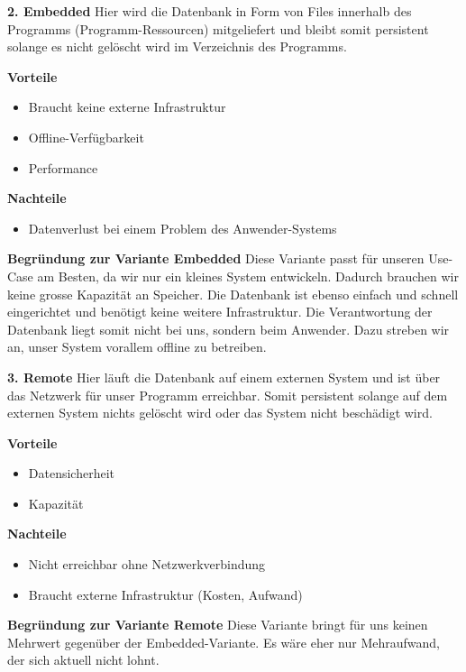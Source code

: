\documentclass[a4paper,12pt]{report}
\begin{document}
    \textbf{2. Embedded}
    Hier wird die Datenbank in Form von Files innerhalb des Programms (Programm-Ressourcen) mitgeliefert und bleibt
    somit persistent solange es nicht gelöscht wird im Verzeichnis des Programms.

    \textbf{Vorteile}
    \begin{itemize}
        \item Braucht keine externe Infrastruktur
        \item Offline-Verfügbarkeit
        \item Performance
    \end{itemize}

    \textbf{Nachteile}
    \begin{itemize}
        \item Datenverlust bei einem Problem des Anwender-Systems
    \end{itemize}

    \textbf{Begründung zur Variante Embedded} Diese Variante passt für unseren Use-Case am Besten, da wir nur ein kleines System entwickeln.
    Dadurch brauchen wir keine grosse Kapazität an Speicher.
    Die Datenbank ist ebenso einfach und schnell eingerichtet und benötigt keine weitere Infrastruktur.
    Die Verantwortung der Datenbank liegt somit nicht bei uns, sondern beim Anwender.
    Dazu streben wir an, unser System vorallem offline zu betreiben.

    \textbf{3. Remote}
    Hier läuft die Datenbank auf einem externen System und ist über das Netzwerk für unser Programm erreichbar.
    Somit persistent solange auf dem externen System nichts gelöscht wird oder das System nicht beschädigt wird.

    \textbf{Vorteile}
    \begin{itemize}
        \item Datensicherheit
        \item Kapazität
    \end{itemize}

    \textbf{Nachteile}
    \begin{itemize}
        \item Nicht erreichbar ohne Netzwerkverbindung
        \item Braucht externe Infrastruktur (Kosten, Aufwand)
    \end{itemize}

    \textbf{Begründung zur Variante Remote} Diese Variante bringt für uns keinen Mehrwert gegenüber der Embedded-Variante.
    Es wäre eher nur Mehraufwand, der sich aktuell nicht lohnt.
\end{document}
